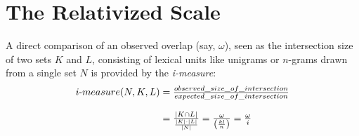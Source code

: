 \documentclass[a4paper]{report}
\begin{document}
\section{The Relativized Scale}
A direct comparison of an observed overlap (say, $\omega$), seen as the intersection size of two sets $K$ and $L$, consisting of lexical units like unigrams or $n$-grams drawn from a single set $N$ is provided by the {\em i-measure}:
\begin{equation}
\begin{array}{l@{}l}
i\hbox{-}measure(N,K,L)
&{}=\frac{observed\_size\_of\_intersection}{expected\_size\_of\_intersection} \\\\
&{}=  \frac{|K \cap L|}{\frac{|K| \cdot |L|}{|N|}} = \frac{\omega}{\left (\frac{ k l}{n}\right) }=\frac{\omega}{i}
\end{array}
\label{eq:imeasure}
\end{equation}
\end{document}
